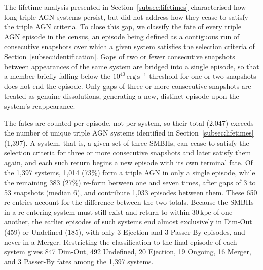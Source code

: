 \documentclass[twocolumn, 10pt]{article}
\begin{document}
The lifetime analysis presented in Section~\ref{subsec:lifetimes} characterised how long triple AGN systems persist, but did not address how they cease to satisfy the triple AGN criteria. To close this gap, we classify the fate of every triple AGN episode in the census, an episode being defined as a contiguous run of consecutive snapshots over which a given system satisfies the selection criteria of Section~\ref{subsec:identification}. Gaps of two or fewer consecutive snapshots between appearances of the same system are bridged into a single episode, so that a member briefly falling below the $10^{40}\,\mathrm{erg\,s^{-1}}$ threshold for one or two snapshots does not end the episode. Only gaps of three or more consecutive snapshots are treated as genuine dissolutions, generating a new, distinct episode upon the system's reappearance.

The fates are counted per episode, not per system, so their total (2,047) exceeds the number of unique triple AGN systems identified in Section~\ref{subsec:lifetimes} (1,397). A system, that is, a given set of three SMBHs, can cease to satisfy the selection criteria for three or more consecutive snapshots and later satisfy them again, and each such return begins a new episode with its own terminal fate. Of the 1,397 systems, 1,014 (73\%) form a triple AGN in only a single episode, while the remaining 383 (27\%) re-form between one and seven times, after gaps of 3 to 53 snapshots (median 6), and contribute 1,033 episodes between them. These 650 re-entries account for the difference between the two totals. Because the SMBHs in a re-entering system must still exist and return to within $30\,\mathrm{kpc}$ of one another, the earlier episodes of such systems end almost exclusively in Dim-Out (459) or Undefined (185), with only 3 Ejection and 3 Passer-By episodes, and never in a Merger. Restricting the classification to the final episode of each system gives 847 Dim-Out, 492 Undefined, 20 Ejection, 19 Ongoing, 16 Merger, and 3 Passer-By fates among the 1,397 systems.
\end{document}
